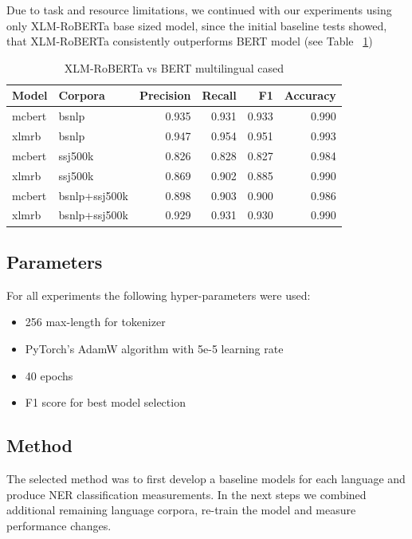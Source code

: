 \documentclass[sigconf]{acmart}
\begin{document}
Due to task and resource limitations, we continued with our experiments using only XLM-RoBERTa base sized model,
since the initial baseline tests showed, that XLM-RoBERTa consistently outperforms BERT model (see Table ~\ref{tab:roberta_vs_bert})

\begin{table}[H]
  \caption{XLM-RoBERTa vs BERT multilingual cased}
  \label{tab:roberta_vs_bert}
  \begin{tabular}{llrrrr}
    \toprule
    Model&Corpora&Precision&Recall&F1&Accuracy\\
    \midrule
    mcbert&bsnlp&0.935&0.931&0.933&0.990\\
    xlmrb&bsnlp&0.947&0.954&0.951&0.993\\
    mcbert&ssj500k&0.826&0.828&0.827&0.984\\
    xlmrb&ssj500k&0.869&0.902&0.885&0.990\\
    mcbert&bsnlp+ssj500k&0.898&0.903&0.900&0.986\\
    xlmrb&bsnlp+ssj500k&0.929&0.931&0.930&0.990\\
    \bottomrule
  \end{tabular}
\end{table}

\subsection{Parameters}
For all experiments the following hyper-parameters were used:
\begin{itemize}
  \item 256 max-length for tokenizer
  \item PyTorch's AdamW algorithm with 5e-5 learning rate
  \item 40 epochs
  \item F1 score for best model selection
\end{itemize}

\subsection{Method}
The selected method was to first develop a baseline models for each language and produce NER classification measurements.
In the next steps we combined additional remaining language corpora, re-train the model and measure performance changes.

\end{document}

